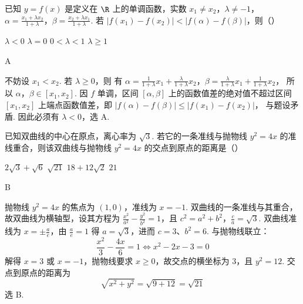 \begin{problem}
已知 \(y = f(x)\) 是定义在 \(\R\) 上的单调函数，实数 \(x_{1} \neq x_{2}\)，\(\lambda \neq -1\)，
\(\alpha = \frac{x_{1} + \lambda x_{2}}{1 + \lambda}\)，\(\beta = \frac{x_{2} + \lambda x_{1}}{1 + \lambda}\).
若 \( |f(x_{1}) - f(x_{2})| < |f(\alpha) - f(\beta)| \)，则（\quad）

\choices
    {\(\lambda < 0\)}
    {\(\lambda = 0\)}
    {\(0 < \lambda < 1\)}
    {\(\lambda \geqslant 1\)}

\begin{answer}
A
\end{answer}

\begin{solution}
不妨设 \(x_1<x_2\). 若 \(\lambda\geqslant0\)，则
有 \(\alpha=\frac1{1+\lambda}x_1+\frac\lambda{1+\lambda}x_2\)，\(\beta=\frac\lambda{1+\lambda}x_1+\frac1{1+\lambda}x_2\)，
所以 \(\alpha\)，\(\beta\in[x_1,x_2]\). 因 \(f\) 单调，区间 \([\alpha,\beta]\) 上的函数值差的绝对值不超过区间 \([x_1,x_2]\) 上端点函数值差，即
\(|f(\alpha)-f(\beta)|\leqslant|f(x_1)-f(x_2)|\)，
与题设矛盾. 因此必须有 \(\lambda<0\)，选 A.
\end{solution}
\end{problem}

\begin{problem}
已知双曲线的中心在原点，离心率为 \(\sqrt{3}\). 若它的一条准线与抛物线 \(y^{2} = 4x\) 的准线重合，则该双曲线与抛物线 \(y^{2} = 4x\) 的交点到原点的距离是（\quad）

\choices
    {\(2\sqrt{3}+\sqrt{6}\)}
    {\(\sqrt{21}\)}
    {\(18+12\sqrt{2}\)}
    {\(21\)}

\begin{answer}
B
\end{answer}

\begin{solution}
抛物线 \(y^2=4x\) 的焦点为 \((1,0)\)，准线为 \(x=-1\). 双曲线的一条准线与其重合，故双曲线为横轴型，设其方程为
\(\frac{x^2}{a^2}-\frac{y^2}{b^2}=1\)，且 \(c^2=a^2+b^2\)，\(\frac ca=\sqrt3\).
双曲线准线为 \(x=\pm\frac ae\)，由 \(\frac ae=1\) 得 \(a=\sqrt3\)，进而 \(c=3\)、\(b^2=6\). 与抛物线联立：
\[
\frac{x^2}{3}-\frac{4x}{6}=1
\Longleftrightarrow
x^2-2x-3=0
\]
解得 \(x=3\) 或 \(x=-1\)，抛物线要求 \(x\geqslant0\)，故交点的横坐标为 \(3\)，且 \(y^2=12\). 交点到原点的距离为
\[
\sqrt{x^2+y^2}=\sqrt{9+12}=\sqrt{21}
\]
选 B.
\end{solution}
\end{problem}

